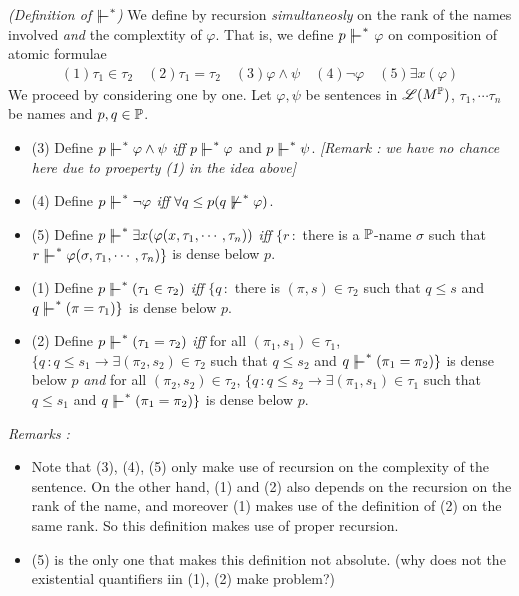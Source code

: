 \documentclass[12pt,a4paper]{article}
\renewenvironment{i}
{\begin{itemize} 
	}%
	{\end{itemize}
}
\begin{document}
 \emph{(Definition of $\forces^*$)} We define by recursion \emph{simultaneosly} on the rank of the names involved \emph{and} the complextity of $\varphi$. That is, we define $p\forces^*$ $\varphi$ on composition of atomic formulae
\begin{align*}
(1) \tau_1 \in \tau_2 \quad (2) \tau_1 = \tau_2 \quad (3) \varphi \wedge \psi \quad (4) \neg \varphi \quad (5) \exists x(\varphi)
\end{align*} 
We proceed by considering one by one. Let $\varphi, \psi$ be sentences in $\mathscr{L}(M^{\mathbb{P}})$, $\tau_1, \cdots \tau_n$ be names and $p, q\in \mathbb{P}$.
\begin{i}
\item[(3)] Define $p\forces^* \varphi\wedge \psi$ \emph{iff} $p\forces^* \varphi$ and $p\forces^* \psi$. \emph{[Remark : we have no chance here due to proeperty (1) in the idea above]}
\item[(4)] Define $p\forces^* \neg \varphi$ \emph{iff} $\forall q\leq p (q\not\forces^* \varphi)$.
\item[(5)] Define $p\forces^* \exists x(\varphi(x, \tau_1, \cdots, \tau_n))$ \emph{iff} $\{r\,:$ there is a $\mathbb{P}$-name $\sigma$ such that $r\forces^* \varphi(\sigma, \tau_1, \cdots, \tau_n) \}$ is dense below $p$.
\item[(1)] Define $p\forces^* (\tau_1 \in \tau_2)$ \emph{iff} $\{ q\, :$ there is $(\pi, s) \in \tau_2$ such that $q\leq s$ and $q\forces^* (\pi = \tau_1) \}$ is dense below $p$.
\item[(2)] Define $p\forces^* (\tau_1 = \tau_2)$ \emph{iff} for all $(\pi_1, s_1) \in \tau_1$, $\{q \, : q\leq s_1 \rightarrow \exists(\pi_2, s_2) \in \tau_2$ such that $q\leq  s_2$ and $q\forces^* (\pi_1 = \pi_2) \}$ is dense below $p$ \emph{and} for all $(\pi_2, s_2) \in \tau_2$, $\{q \,: q\leq s_2 \rightarrow \exists (\pi_1, s_1) \in \tau_1$ such that $q\leq s_1$ and $q\forces^* (\pi_1 = \pi_2)\}$ is dense below $p$.
\end{i}
\emph{Remarks :}
\begin{i}
\item Note that (3), (4), (5) only make use of recursion on the complexity of the sentence. On the other hand, (1) and (2) also depends on the recursion on the rank of the name, and moreover (1) makes use of the definition of (2) on the same rank. So this definition makes use of proper recursion.
\item (5) is the only one that makes this definition not absolute. (why does not the existential quantifiers iin (1), (2) make problem?)
\end{i}
\s
\end{document}
